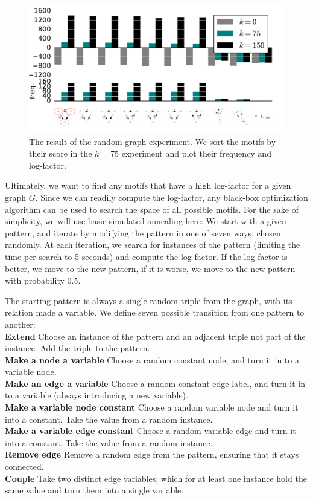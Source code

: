 \documentclass[runningheads]{style/llncs}
\begin{document}
\begin{figure}[tb]
  \centering
    \includegraphics[width=\linewidth]{synthetic-plot.pdf}
    \caption{The result of the random graph experiment. We sort the motifs by their score in the $k=75$ experiment and plot their frequency and log-factor.}
    \label{figure:synthetic}
\end{figure}

\label{section:search}

Ultimately, we want to find any motifs that have a high log-factor for a given graph $G$. Since we can readily compute the log-factor, any black-box optimization algorithm can be used to search the space of all possible motifs. For the sake of simplicity, we will use basic simulated annealing here: We start with a given pattern, and iterate by modifying the pattern in one of seven ways, chosen randomly. At each iteration, we search for instances of the pattern (limiting the time per search to 5 seconds) and compute the log-factor. If the log factor is better, we move to the new pattern, if it is worse, we move to the new pattern with probability 0.5. 

The starting pattern is always a single random triple from the graph, with its relation made a variable. We define seven possible transition from one pattern to another: \\
\textbf{Extend} Choose an instance of the pattern and an adjacent triple not part of the instance. Add the triple to the pattern.\\
\textbf{Make a node a variable} Choose a random constant node, and turn it in to a variable node.\\
\textbf{Make an edge a variable } Choose a random constant edge label, and turn it in to a variable (always introducing a new variable).\\
\textbf{Make a variable node constant} Choose a random variable node and turn it into a constant. Take the value from a random instance.\\
\textbf{Make a variable edge constant} Choose a random variable edge and turn it into a constant. Take the value from a random instance.\\
\textbf{Remove edge} Remove a random edge from the pattern, ensuring that it stays connected.\\
\textbf{Couple} Take two distinct edge variables, which for at least one instance hold the same value and turn them into a single variable.
\end{document}
